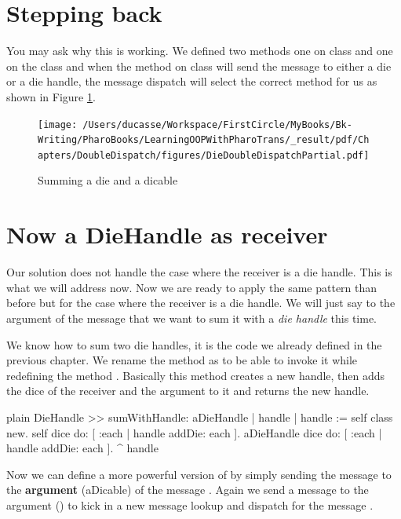 \documentclass[10pt,twoside,english]{_support/latex/sbabook/sbabook}
\begin{document}
\section{Stepping back}
You may ask why this is working. We defined two methods  one on class  and one on the class 
and when the method \textcode{+} on class  will send the message  to either a die or a die handle, the message dispatch will select the correct method  for us as shown in Figure \ref{figDieDoubleDispatchPartial}.


\begin{figure}

\begin{center}
\texttt{[image: /Users/ducasse/Workspace/FirstCircle/MyBooks/Bk-Writing/PharoBooks/LearningOOPWithPharoTrans/\_result/pdf/Chapters/DoubleDispatch/figures/DieDoubleDispatchPartial.pdf]}\caption{Summing a die and a dicable\label{figDieDoubleDispatchPartial}}\end{center}
\end{figure}

\section{Now a DieHandle as receiver}
Our solution does not handle the case where the receiver is a die handle. This is what we will address now. 
Now we are ready to apply the same pattern than before but for the case where the receiver is a die handle. We will just say to the argument of the message \textcode{+} that we want to sum it with a \textit{die handle} this time.

We know how to sum two die handles, it is the code we already defined in the previous chapter. We rename the \textcode{+} method
as  to be able to invoke it while redefining the method \textcode{+}. Basically this method creates a new handle, then adds the dice of the receiver and the argument to it and returns the new handle.

\begin{displaycode}{plain}
DieHandle >> sumWithHandle: aDieHandle
	| handle |
	handle := self class new.
	self dice do: [ :each | handle addDie: each ].
	aDieHandle dice do: [ :each | handle addDie: each ].
	^ handle
\end{displaycode}

Now we can define a more powerful version of \textcode{+} by simply sending the message  to the \textbf{argument} (aDicable) of the message \textcode{+}. Again we send a message to the argument () to kick in a new message lookup and dispatch  for the message .
\end{document}

